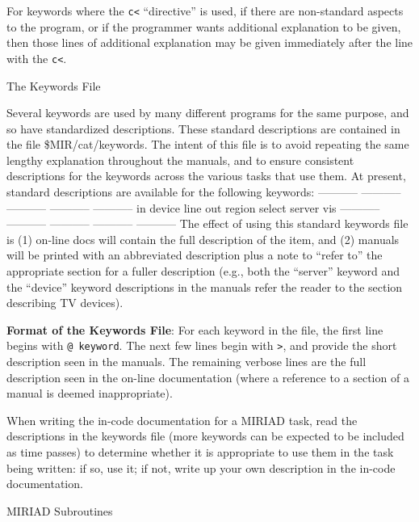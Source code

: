 For keywords where the {\tt c<} ``directive'' is used, if there are
non-standard aspects to the program, or if the programmer wants additional
explanation to be given, then those lines of additional explanation may
be given immediately after the line with the {\tt c<}.

\beginsection The Keywords File

Several keywords are used by many different programs for the same purpose,
and so have standardized descriptions.  These standard descriptions are
contained in the file \$MIR/cat/keywords.  The intent of this file is to
avoid repeating the same lengthy explanation throughout the manuals, and to
ensure consistent descriptions for the keywords across the various tasks
that use them.  At present, standard descriptions are available for the
following keywords:
{\ninepoint\begintt
----------- ----------- ----------- ----------- -----------
in          device      line        out         region
select      server      vis
----------- ----------- ----------- ----------- -----------
\endtt}
The effect of using this standard keywords file is (1) on-line docs will
contain the full description of the item, and (2) manuals will be printed
with an abbreviated description plus a note to ``refer to'' the
appropriate section for a fuller description (e.g., both the ``server''
keyword and the ``device'' keyword descriptions in the manuals refer the
reader to the section describing TV devices).  

{\bf Format of the Keywords File}:  For each keyword in the file, the
first line begins with {\tt @ keyword}.  The next few lines begin with
{\tt >}, and provide the short description seen in the manuals.  The
remaining verbose lines are the full description seen in the on-line
documentation (where a reference to a section of a manual is deemed
inappropriate).

When writing the in-code documentation for a MIRIAD task, read the
descriptions in the keywords file (more keywords can be expected to be
included as time passes) to determine whether it is appropriate to use them
in the task being written:  if so, use it; if not, write up your own
description in the in-code documentation.

\beginsection MIRIAD Subroutines

